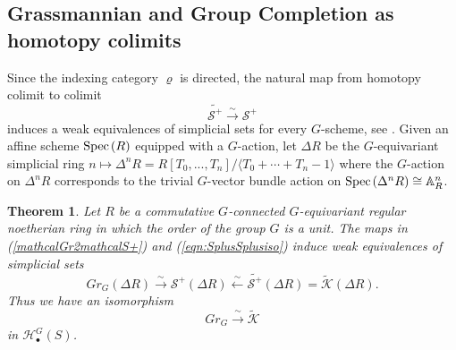 \documentclass[11pt,twoside]{amsart}
\newtheorem{theorem}{Theorem}[section]
\theoremstyle{definition}
\theoremstyle{remark}
\numberwithin{equation}{section}
\newcommand{\mc}{\mathcal}
\newcommand{\spec}{\mathrm{Spec\hskip .5mm }}
\begin{document}
\subsection{Grassmannian and Group Completion as homotopy colimits}
	\label{dfn:GrRtoGW}

Since the indexing category $\varrho$ is directed, the natural map from homotopy colimit to colimit  
	\begin{equation}\label{eqn:SplusSplusiso}
	\widetilde{\mathscr{S}^+ }\stackrel{\sim}{\to} \mc{S}^+ \end{equation}
induces a weak equivalences of simplicial sets for every $G$-scheme, see \cite[Lemma 13]{ST15}. 
Given an affine scheme $\spec(R)$ equipped with a $G$-action,
let $\Delta R$ be the $G$-equivariant simplicial ring $n\mapsto \Delta^nR = R[T_0,...,T_n]/\langle T_0 + \cdots + T_n - 1\rangle$ where the $G$-action on $\Delta^nR$ corresponds to the trivial $G$-vector bundle action on $\spec(\Delta^nR)\cong \mathbb{A}^n_R$.

\begin{theorem}
\label{thm:simplHtpyEq}
Let $R$ be a commutative $G$-connected $G$-equivariant regular noetherian ring in which 
the order of the group $G$ is a unit. The maps in (\ref{mathcalGr2mathcalS+}) and (\ref{eqn:SplusSplusiso}) induce weak equivalences of simplicial sets
$$Gr_G(\Delta R) \stackrel{\sim}{\rightarrow}\mc{S}^+(\Delta R)\xleftarrow{\sim} 
\widetilde{\mathscr{S}^+}(\Delta R) = \widetilde{\mathcal{K}}(\Delta R).$$ 
Thus we have an isomorphism 
\[
Gr_G \xrightarrow{\ \sim\ } \widetilde{\mathcal{K}}
\]
in $\mathcal{H}^G_\bullet(S)$. 
\end{theorem}
\end{document}
